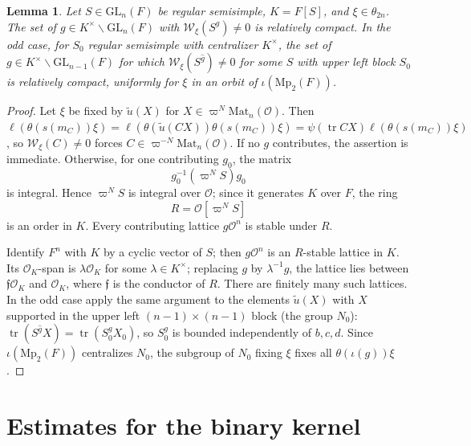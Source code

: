 \documentclass[11pt,oneside,notitlepage]{book}
\numberwithin{equation}{section}
\theoremstyle{plain}
\newtheorem{lemma}[theorem]{Lemma}
\theoremstyle{definition}
\newcommand{\cO}{\mathcal{O}}
\newcommand{\GL}{\mathrm{GL}}
\newcommand{\Mp}{\mathrm{Mp}}
\newcommand{\Mat}{\mathrm{Mat}}
\newcommand{\cW}{\mathcal{W}}
\newcommand{\tr}{\operatorname{tr}}
\begin{document}
\begin{lemma}\label{lem:compact-outer}
Let $S\in\GL_n(F)$ be regular semisimple, $K=F[S]$, and $\xi\in\theta_{2n}$. The set of $g\in K^\times\backslash\GL_n(F)$ with $\cW_\xi(S^g)\ne0$ is relatively compact. In the odd case, for $S_0$ regular semisimple with centralizer $K^\times$, the set of $g\in K^\times\backslash\GL_{n-1}(F)$ for which $\cW_{\xi}(S^{\hat g})\ne0$ for some $S$ with upper left block $S_0$ is relatively compact, uniformly for $\xi$ in an orbit of $\iota(\Mp_2(F))$.
\end{lemma}
\begin{proof}
Let $\xi$ be fixed by $\tilde u(X)$ for $X\in\varpi^N\Mat_n(\cO)$. Then $\ell(\theta(s(m_C))\xi)=\ell(\theta(\tilde u(CX))\theta(s(m_C))\xi)=\psi(\tr CX)\ell(\theta(s(m_C))\xi)$, so $\cW_\xi(C)\ne0$ forces $C\in\varpi^{-N}\Mat_n(\cO)$. If no \(g\) contributes, the assertion is immediate. Otherwise, for one contributing \(g_0\), the matrix
\[
g_0^{-1}(\varpi^NS)g_0
\]
is integral. Hence \(\varpi^NS\) is integral over \(\mathcal O\); since it generates \(K\) over \(F\), the ring
\[
R=\mathcal O[\varpi^NS]
\]
is an order in \(K\). Every contributing lattice \(g\mathcal O^n\) is stable under \(R\).


Identify $F^n$ with $K$ by a cyclic vector of $S$; then $g\cO^n$ is an $R$-stable lattice in $K$. Its $\cO_K$-span is $\lambda\cO_K$ for some $\lambda\in K^\times$; replacing $g$ by $\lambda^{-1}g$, the lattice lies between $\mathfrak f\cO_K$ and $\cO_K$, where $\mathfrak f$ is the conductor of $R$. There are finitely many such lattices. In the odd case apply the same argument to the elements $\tilde u(X)$ with $X$ supported in the upper left $(n-1)\times(n-1)$ block (the group $N_0$): $\tr(S^{\hat g}X)=\tr(S_0^gX_0)$, so $S_0^g$ is bounded independently of $b,c,d$. Since $\iota(\Mp_2(F))$ centralizes $N_0$, the subgroup of $N_0$ fixing $\xi$ fixes all $\theta(\iota(g))\xi$.
\end{proof}

\section{Estimates for the binary kernel}
\end{document}
